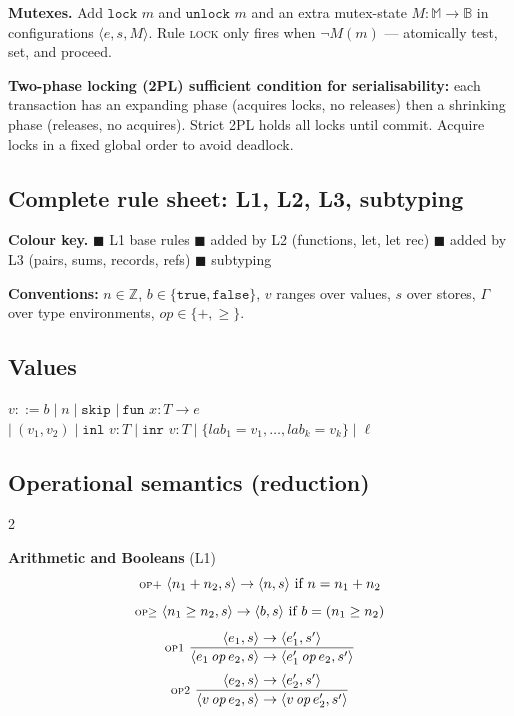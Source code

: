 \documentclass[11pt,a4paper]{article}
\newcommand{\Lone}[1]{{\color{l1color}#1}}
\newcommand{\Ltwo}[1]{{\color{l2color}#1}}
\newcommand{\Lthree}[1]{{\color{l3color}#1}}
\newcommand{\Lsub}[1]{{\color{subcolor}#1}}
\newcommand{\rname}[1]{\textsc{\footnotesize#1}}
\begin{document}
\textbf{Mutexes.} Add $\texttt{lock } m$ and $\texttt{unlock } m$ and an extra mutex-state $M : \mathbb{M} \to \mathbb{B}$ in configurations $\langle e, s, M\rangle$. Rule \rname{lock} only fires when $\neg M(m)$ --- atomically test, set, and proceed.

\textbf{Two-phase locking (2PL) sufficient condition for serialisability:} each transaction has an expanding phase (acquires locks, no releases) then a shrinking phase (releases, no acquires). Strict 2PL holds all locks until commit. Acquire locks in a fixed global order to avoid deadlock.

\hrulefill

\begin{landscape}
\section{Complete rule sheet: L1, L2, L3, subtyping}
\label{sec:rules}

\textbf{Colour key.}\quad
\Lone{$\blacksquare$ L1 base rules} \quad
\Ltwo{$\blacksquare$ added by L2 (functions, let, let rec)} \quad
\Lthree{$\blacksquare$ added by L3 (pairs, sums, records, refs)} \quad
\Lsub{$\blacksquare$ subtyping}

\textbf{Conventions:} $n \in \mathbb{Z}$, $b \in \{\texttt{true}, \texttt{false}\}$, $v$ ranges over values, $s$ over stores, $\Gamma$ over type environments, $\mathit{op} \in \{+, \geq\}$.

\subsection*{Values}
\Lone{$v ::= b \mid n \mid \texttt{skip}$} \quad
\Ltwo{$\mid\ \texttt{fun } x{:}T \to e$} \quad
\Lthree{$\mid\ (v_1, v_2) \mid \texttt{inl } v{:}T \mid \texttt{inr } v{:}T \mid \{\mathit{lab}_1 = v_1, \ldots, \mathit{lab}_k = v_k\} \mid \ell$}

\subsection*{Operational semantics (reduction)}

\begin{multicols}{2}
\small

\textbf{Arithmetic and Booleans} \Lone{(L1)}
\[ \rname{op+}\ \langle n_1 + n_2, s\rangle \to \langle n, s\rangle \text{ if } n = n_1 + n_2 \]
\[ \rname{op\(\geq\)}\ \langle n_1 \geq n_2, s\rangle \to \langle b, s\rangle \text{ if } b = (n_1 \geq n_2) \]
\[ \rname{op1}\ \dfrac{\langle e_1, s\rangle \to \langle e_1', s'\rangle}{\langle e_1\,\mathit{op}\,e_2, s\rangle \to \langle e_1'\,\mathit{op}\,e_2, s'\rangle} \]
\[ \rname{op2}\ \dfrac{\langle e_2, s\rangle \to \langle e_2', s'\rangle}{\langle v\,\mathit{op}\,e_2, s\rangle \to \langle v\,\mathit{op}\,e_2', s'\rangle} \]


\end{multicols}
\end{landscape}
\end{document}
